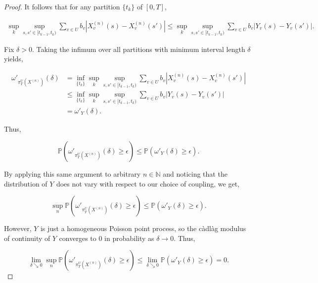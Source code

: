 \documentclass[12pt]{article}
\newcommand{\mb}{\mathbb}
\newcommand{\ra}{\rightarrow}
\newcommand{\ep}{\epsilon}
\newcommand{\pr}{\mb{P}}							%
\renewcommand{\v}{v}							%
\renewcommand{\U}{U}							%
\renewcommand{\b}{b}							%
\newcommand{\T}{T}								%
\renewcommand{\t}{t}							%
\newcommand{\proj}{\pi}							%
\renewcommand{\tt}{s}							%
\newcommand{\ttt}{s'}							%
\newcommand{\X}{X}								%
\newcommand{\vsi}[1]{^{#1}}						%
\newcommand{\cind}[1]{_{#1}}					%
\newcommand{\tp}[1]{(#1)}						%
\newcommand{\tip}[1]{#1}						%
\newcommand{\ts}[1]{_{#1}}						%
\newcommand{\sln}[1]{^{(#1)}}					%
\newcommand{\indx}[1]{_{#1}}					%
\newcommand{\XX}{Y}								%
\renewcommand{\it}{k}							%
\begin{document}
\begin{proof}
It follows that for any partition \(\{\t\indx{\it}\}\) of \([0,\T]\),

\begin{align*}
\sup_\it\sup_{\tt,\ttt \in [\t\indx{\it-1},\t\indx{\it})} \sum_{\v\in \U} \b\cind{\v}|\X\sln{n}\cind{\v}\tp{\tt} - \X\sln{n}\cind{\v}\tp{\ttt}|\leq \sup_\it\sup_{\tt,\ttt \in [\t\indx{\it-1},\t\indx{\it})} \sum_{\v\in \U} \b\cind{\v}|\XX\cind{\v}\tp{\tt} - \XX\cind{\v}\tp{\ttt}|.
\end{align*}

Fix \(\delta > 0\). Taking the infimum over all partitions with minimum interval length \(\delta\) yields,

\begin{align*}
\omega'_{\proj\vsi{\U}\ts{\T}\left(\X\sln{n}\cind{}\tip{}\right)}(\delta) &= \inf_{\{\t\indx{\it}\}}\sup_\it\sup_{\tt,\ttt \in [\t\indx{\it-1},\t\indx{\it})} \sum_{\v\in \U} \b\cind{\v}|\X\sln{n}\cind{\v}\tp{\tt} - \X\sln{n}\cind{\v}\tp{\ttt}|\\
&\leq \inf_{\{\t\indx{\it}\}}\sup_\it\sup_{\tt,\ttt \in [\t\indx{\it-1},\t\indx{\it})} \sum_{\v\in \U} \b\cind{\v}|\XX\cind{\v}\tp{\tt} - \XX\cind{\v}\tp{\ttt}|\\
&= \omega'_{\XX\cind{}\tip{}}(\delta).
\end{align*}

Thus,

\[\pr\left(\omega'_{\proj\vsi{\U}\ts{\T}\left(\X\sln{n}\cind{}\tip{}\right)}(\delta) \geq \ep\right) \leq \pr\left(\omega'_{\XX\cind{}\tip{}}(\delta) \geq \ep\right).\]

By applying this same argument to arbitrary \(n\in \mb{N}\) and noticing that the distribution of \(\XX\cind{}\tip{}\) does not vary with respect to our choice of coupling, we get,

\[\sup_{n}\pr\left(\omega'_{\proj\vsi{\U}\ts{\T}\left(\X\sln{n}\cind{}\tip{}\right)}(\delta)\geq \ep\right) \leq \pr\left(\omega'_{\XX\cind{}\tip{}}(\delta) \geq \ep\right).\]

However, \(\XX\cind{}\tip{}\) is just a homogeneous Poisson point process, so the c\`adl\`ag modulus of continuity of \(\XX\cind{}\tip{}\) converges to 0 in probability as \(\delta \ra 0\). Thus,

\[\lim_{\delta \searrow 0}\sup_{n}\pr\left(\omega'_{\proj\vsi{\U}\ts{\T}\left(\X\sln{n}\cind{}\tip{}\right)}(\delta) \geq \ep\right) \leq \lim_{\delta\searrow 0}\pr\left(\omega'_{\XX\cind{}\tip{}}(\delta)\geq \ep\right) = 0.\]


\end{proof}
\end{document}
